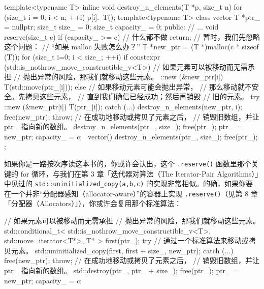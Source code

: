\begin{codebox}[cpp]
    template<typename T>
    inline void destroy_n_elements(T *p, size_t n)
    {
      for (size_t i = 0; i < n; ++i) {
        p[i].~T();
      }
    }
    template<typename T>
    class vector {
      T *ptr_ = nullptr;
      size_t size_ = 0;
      size_t capacity_ = 0;
      public:
      // ...
      void reserve(size_t c) {
        if (capacity_ >= c) {
          // 什么都不做
          return;
        }
        // 暂时，我们先忽略这个问题：
        // “如果 malloc 失败怎么办？”
        T *new_ptr = (T *)malloc(c * sizeof (T));
        for (size_t i=0; i < size_; ++i) {
          if constexpr (std::is_nothrow_move_constructible_v<T>) {
            // 如果元素可以被移动而无需承担
            // 抛出异常的风险，那我们就移动这些元素。
            ::new (&new_ptr[i]) T(std::move(ptr_[i]));
          } else {
            // 如果移动元素可能会抛出异常，
            // 那么移动就不安全。先拷贝这些元素，
            // 直到我们确信已经成功；然后再销毁
            // 旧的元素。
            try {
              ::new (&new_ptr[i]) T(ptr_[i]);
            } catch (...) {
              destroy_n_elements(new_ptr, i);
              free(new_ptr);
              throw;
            }
          }
        }
        // 在成功地移动或拷贝了元素之后，
        // 销毁旧数组，并让 ptr_ 指向新的数组。
        destroy_n_elements(ptr_, size_);
        free(ptr_);
        ptr_ = new_ptr;
        capacity_ = c;
      }
      ~vector() {
        destroy_n_elements(ptr_, size_);
        free(ptr_);
      }
    };
\end{codebox}

如果你是一路按次序读这本书的，你或许会认出，这个 \texttt{.reserve(\allowbreak{})\allowbreak{}} 函数里那个关键的 for 循环，与我们在第 3 章「迭代器对算法（The Iterator-Pair Algorithms）」中见过的 \texttt{std::\allowbreak{}uninitialized\_\allowbreak{}copy(\allowbreak{}a,\allowbreak{}b,\allowbreak{}c)\allowbreak{}} 的实现非常相似。的确，如果你要在一个并非“分配器感知（allocator-aware）”的容器上实现 \texttt{.reserve(\allowbreak{})\allowbreak{}}（见第 8 章「分配器（Allocators）」），你或许会复用那个标准算法：

\begin{codebox}[cpp]
    // 如果元素可以被移动而无需承担
    // 抛出异常的风险，那我们就移动这些元素。
    std::conditional_t<
      std::is_nothrow_move_constructible_v<T>,
      std::move_iterator<T*>,
      T*
      > first(ptr_);
    try {
      // 通过一个标准算法来移动或拷贝元素。
      std::uninitialized_copy(first, first + size_, new_ptr);
    } catch (...) {
      free(new_ptr);
      throw;
    }
    // 在成功地移动或拷贝了元素之后，
    // 销毁旧数组，并让 ptr_ 指向新的数组。
    std::destroy(ptr_, ptr_ + size_);
    free(ptr_);
    ptr_ = new_ptr;
    capacity_ = c;
\end{codebox}

